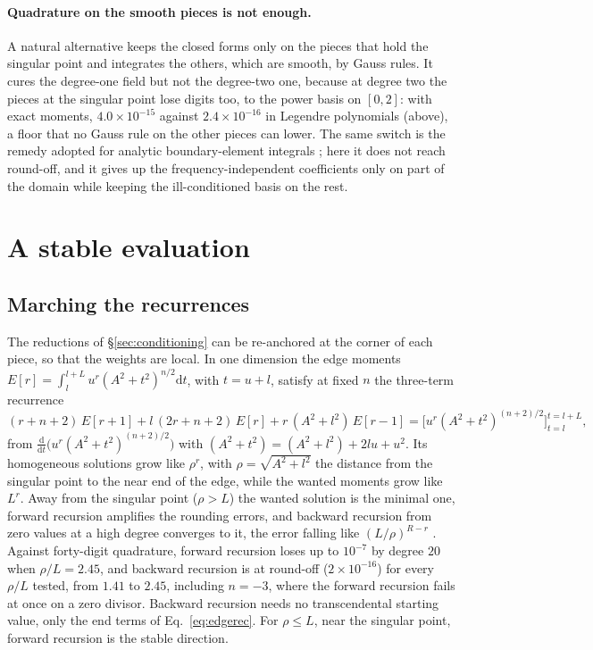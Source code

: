 \documentclass[11pt,a4paper]{article}
\newcommand{\dd}{\mathrm{d}}
\begin{document}
\paragraph{Quadrature on the smooth pieces is not enough.} A natural alternative keeps the closed forms only
on the pieces that hold the singular point and integrates the others, which are smooth, by Gauss rules.
It cures the degree-one field but not the degree-two one, because at degree two the pieces at the singular
point lose digits too, to the power basis on $[0,2]$: with exact moments, $4.0\times10^{-15}$ against
$2.4\times10^{-16}$ in Legendre polynomials (above), a floor that no Gauss rule on the other pieces can
lower. The same switch is the remedy adopted for analytic boundary-element integrals
\citep{KanekoGumerovDuraiswami2024,GumerovKanekoDuraiswami2024}; here it does not reach round-off, and
it gives up the frequency-independent coefficients only on part of the domain while keeping the
ill-conditioned basis on the rest.

\section{A stable evaluation}\label{sec:stable}

\subsection{Marching the recurrences}\label{sec:marching}

The reductions of \S\ref{sec:conditioning} can be re-anchored at the corner of each piece, so that the
weights are local. In one dimension the edge moments $E[r]=\int_l^{l+L}u^r(A^2+t^2)^{n/2}\dd t$, with
$t=u+l$, satisfy at fixed $n$ the three-term recurrence
\begin{equation}\label{eq:edgerec}
  (r+n+2)\,E[r+1]+l\,(2r+n+2)\,E[r]+r\,(A^2+l^2)\,E[r-1]=\bigl[u^r(A^2+t^2)^{(n+2)/2}\bigr]_{t=l}^{t=l+L},
\end{equation}
from $\frac{\dd}{\dd t}\bigl(u^r(A^2+t^2)^{(n+2)/2}\bigr)$ with $(A^2+t^2)=(A^2+l^2)+2lu+u^2$. Its homogeneous
solutions grow like $\rho^r$, with $\rho=\sqrt{A^2+l^2}$ the distance from the singular point to the near
end of the edge, while the wanted moments grow like $L^r$. Away from the singular point ($\rho>L$) the
wanted solution is the minimal one, forward recursion amplifies the rounding errors, and backward
recursion from zero values at a high degree converges to it, the error falling like $(L/\rho)^{R-r}$
\citep{Gautschi1967,Olver1967}. Against forty-digit quadrature, forward recursion loses up to
$10^{-7}$ by degree $20$ when $\rho/L=2.45$, and backward recursion is at round-off ($2\times10^{-16}$) for
every $\rho/L$ tested, from $1.41$ to $2.45$, including $n=-3$, where the forward recursion fails at once on a zero
divisor. Backward recursion needs no transcendental starting value, only the end terms of
Eq.~\eqref{eq:edgerec}. For $\rho\le L$, near the singular point, forward recursion is the stable direction.
\end{document}
